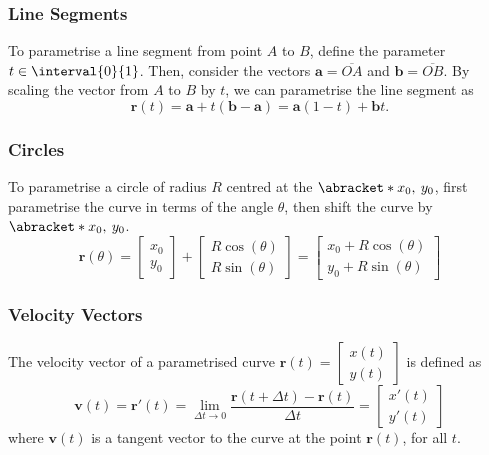 \documentclass{article}
\begin{document}
\subsubsection{Line Segments}
To parametrise a line segment from point \(A\) to \(B\), define the
parameter \(t \in \interval{0}{1}\). Then, consider the vectors
\(\symbf{a} = \overline{OA}\) and \(\symbf{b} = \overline{OB}\). By
scaling the vector from \(A\) to \(B\) by \(t\), we can parametrise the
line segment as
\begin{equation*}
    \symbf{r}\left( t \right) = \symbf{a} + t \left( \symbf{b} - \symbf{a} \right) = \symbf{a} \left( 1 - t \right) + \symbf{b} t.
\end{equation*}
\subsubsection{Circles}
To parametrise a circle of radius \(R\) centred at the
\(\abracket*{x_0,\: y_0}\), first parametrise the curve in terms of the
angle \(\theta\), then shift the curve by \(\abracket*{x_0,\: y_0}\).
\begin{equation*}
    \symbf{r}\left( \theta \right) =
    \begin{bmatrix}
        x_0 \\
        y_0
    \end{bmatrix}
    +
    \begin{bmatrix}
        R \cos{\left( \theta \right)} \\
        R \sin{\left( \theta \right)}
    \end{bmatrix}
    =
    \begin{bmatrix}
        x_0 + R \cos{\left( \theta \right)} \\
        y_0 + R \sin{\left( \theta \right)}
    \end{bmatrix}
\end{equation*}
\subsubsection{Velocity Vectors}
The velocity vector of a parametrised curve \(\symbf{r}\left( t \right)
=
\begin{bmatrix}
    x\left( t \right) \\
    y\left( t \right)
\end{bmatrix}
\) is defined as
\begin{equation*}
    \symbf{v}\left( t \right) = \symbf{r}'\left( t \right) = \lim_{\Delta t \to 0} \frac{\symbf{r}\left( t + \Delta t \right) - \symbf{r}\left( t \right)}{\Delta t} =
    \begin{bmatrix}
        x'\left( t \right) \\
        y'\left( t \right)
    \end{bmatrix}
\end{equation*}
where \(\symbf{v}\left( t \right)\) is a tangent vector to the curve at the point \(\symbf{r}\left( t \right)\), for all \(t\).
\end{document}

